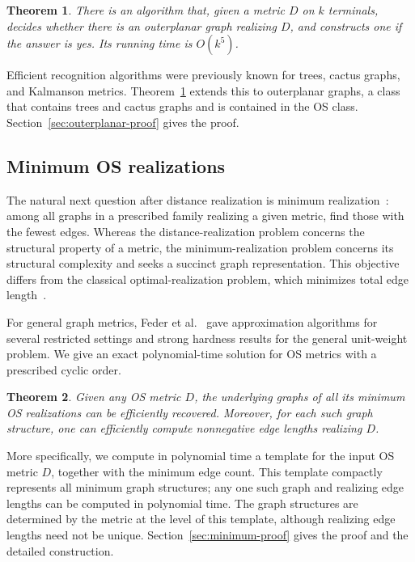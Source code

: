 \documentclass[11pt]{article}
\newtheorem{theorem}{Theorem}
\begin{document}
\begin{theorem}\label{thm: main}
There is an algorithm that, given a metric $D$ on $k$ terminals, decides whether there is an outerplanar graph realizing $D$, and constructs one if the answer is yes. Its running time is $O(k^5)$.
\end{theorem}

Efficient recognition algorithms were previously known for trees, cactus graphs, and Kalmanson metrics. Theorem~\ref{thm: main} extends this to outerplanar graphs, a class that contains trees and cactus graphs and is contained in the OS class. Section~\ref{sec:outerplanar-proof} gives the proof.

\subsection{Minimum OS realizations}\label{subsec:intro-minimum}

The natural next question after distance realization is minimum realization~\cite{feder2003representing}: among all graphs in a prescribed family realizing a given metric, find those with the fewest edges. Whereas the distance-realization problem concerns the structural property of a metric, the minimum-realization problem concerns its structural complexity and seeks a succinct graph representation. This objective differs from the classical optimal-realization problem, which minimizes total edge length~\cite{Althoefer88,Winkler88}.

For general graph metrics, Feder et al.~\cite{feder2003representing} gave approximation algorithms for several restricted settings and strong hardness results for the general unit-weight problem. We give an exact polynomial-time solution for OS metrics with a prescribed cyclic order.

\setcounter{theorem}{3}
\begin{theorem}\label{thm: minimum main}
Given any OS metric $D$, the underlying graphs of all its minimum OS realizations can be efficiently recovered. Moreover, for each such graph structure, one can efficiently compute nonnegative edge lengths realizing $D$.
\end{theorem}

More specifically, we compute in polynomial time a template for the input OS metric $D$, together with the minimum edge count. This template compactly represents all minimum graph structures; any one such graph and realizing edge lengths can be computed in polynomial time. The graph structures are determined by the metric at the level of this template, although realizing edge lengths need not be unique. Section~\ref{sec:minimum-proof} gives the proof and the detailed construction.
\end{document}
